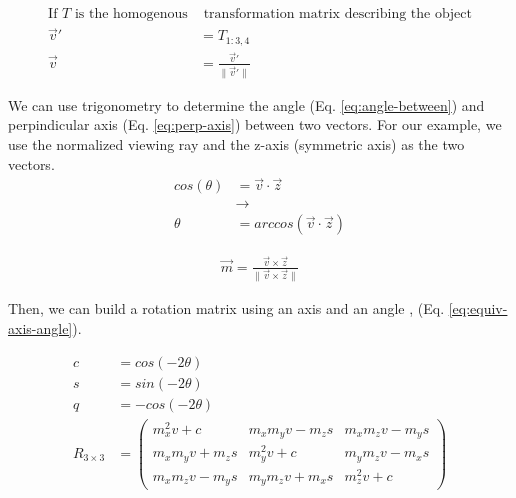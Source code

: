 \begin{equation}
    \begin{aligned}
        \text{If $T$ is the homogenous}& \text{ transformation matrix describing the object} \\
        \vec{v}' &= T_{1:3,4} \\
        \vec{v} & = \frac{\vec{v}'}{\|\vec{v}'\|}
    \end{aligned}
    \label{eq:view-ray}
\end{equation}


We can use trigonometry to determine the angle (Eq. \ref{eq:angle-between}) and perpindicular axis (Eq. \ref{eq:perp-axis}) between two vectors. For our example, we use the normalized viewing ray and the z-axis (symmetric axis) as the two vectors.
\begin{equation}
    \begin{aligned}
        cos(\theta) &= \vec{v} \cdot \vec{z} \\
        &\rightarrow \\
        \theta &= arccos(\vec{v} \cdot \vec{z})
    \end{aligned}
    \label{eq:angle-between}
\end{equation}

\begin{equation}
    \begin{aligned}
        \vec{m} = \frac{\vec{v} \times \vec{z}}{\|\vec{v} \times \vec{z}\|}
    \end{aligned}
    \label{eq:perp-axis}
\end{equation}

Then, we can build a rotation matrix using an axis and an angle \cite{craneKinematicAnalysisRobot2008}, (Eq. \ref{eq:equiv-axis-angle}).

\begin{equation}
    \begin{aligned}
        c &= cos(-2\theta)\\
        s &= sin(-2\theta) \\
        q &= -cos(-2\theta)\\
        R_{3 \times 3} &= \begin{pmatrix}
            m_x^2v + c & m_xm_yv - m_zs & m_x m_z v - m_y s \\ m_x m_y v + m_z s & m_y^2 v + c & m_y m_z v - m_x s \\ m_x m_z v - m_y s & m_y m_z v + m_x s & m_z^2 v + c
        \end{pmatrix}
    \end{aligned}
    \label{eq:equiv-axis-angle}
\end{equation}

